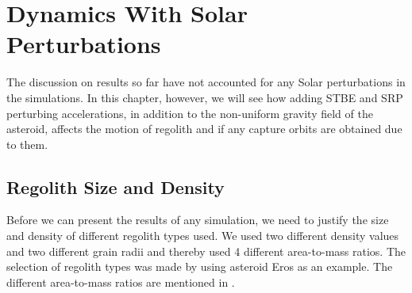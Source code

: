 \chapter{Dynamics With Solar Perturbations}
\label{chap:dynamics_with_solar_perturbations}
\graphicspath{{Results/Images/}}

The discussion on results so far have not accounted for any Solar perturbations in the simulations. In this chapter, however, we will see how adding \gls{STBE} and \gls{SRP} perturbing accelerations, in addition to the non-uniform gravity field of the asteroid, affects the motion of regolith and if any capture orbits are obtained due to them.

\section{Regolith Size and Density}
\label{sec:regolith_size_density}
Before we can present the results of any simulation, we need to justify the size and density of different regolith types used. We used two different density values and two different grain radii and thereby used 4 different area-to-mass ratios. The selection of regolith types was made by using asteroid Eros as an example. The different area-to-mass ratios are mentioned in .

